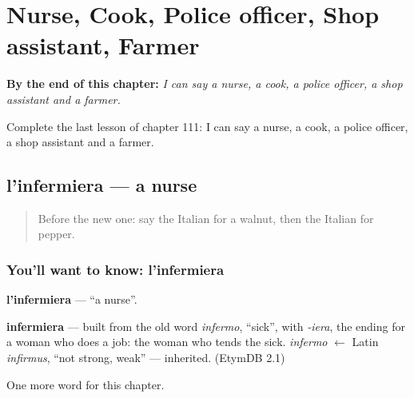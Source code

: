 
\chapter{Nurse, Cook, Police officer, Shop assistant, Farmer}
\label{ch:it-nurse-cook-police-officer-shop-assistant-farmer}

\begin{chapteropening}
\textbf{By the end of this chapter:} \emph{I can say a nurse, a cook, a police officer, a shop assistant and a farmer.}

Complete the last lesson of chapter 111: I can say a nurse, a cook, a police officer, a shop assistant and a farmer.
\end{chapteropening}

\section[l'infermiera]{l'infermiera — a nurse}

\label{lesson:IT-C111-infermiera}



\begin{quote}
Before the new one: say the Italian for a walnut, then the Italian for pepper.
\end{quote}

\subsection*{You'll want to know: l'infermiera}
\textbf{l'infermiera} — \textquotedblleft{}a nurse\textquotedblright{}.

\begin{cousinweb}
\textbf{infermiera} — built from the old word \emph{infermo}, \textquotedblleft{}sick\textquotedblright{}, with \emph{-iera}, the ending for a woman who does a job: the woman who tends the sick. \emph{infermo} $\leftarrow$ Latin \emph{infirmus}, \textquotedblleft{}not strong, weak\textquotedblright{} — inherited. (EtymDB 2.1)
\end{cousinweb}

\begin{grammarlens}[title={What you've built}]
One more word for this chapter.
\end{grammarlens}

